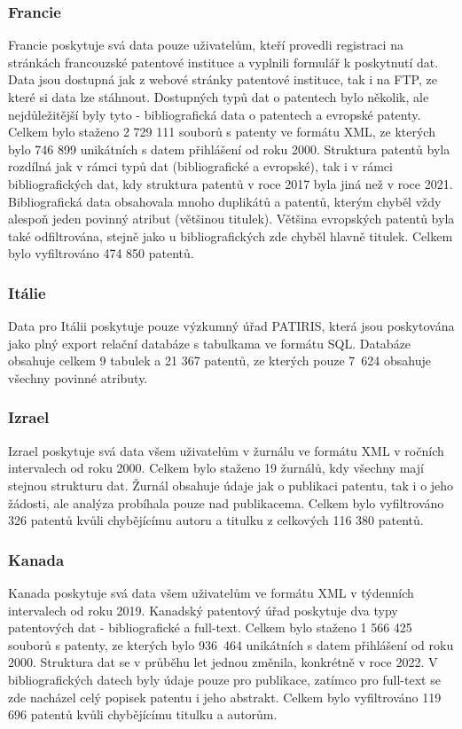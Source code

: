 \subsubsection{Francie}
Francie poskytuje svá data pouze uživatelům, kteří provedli registraci na stránkách francouzské patentové instituce a vyplnili formulář k poskytnutí dat. Data jsou dostupná jak z webové stránky patentové instituce, tak i na \gls{FTP}, ze které si data lze stáhnout. Dostupných typů dat o patentech bylo několik, ale nejdůležitější byly tyto - bibliografická data o patentech a evropské patenty.
\newline
\indent Celkem bylo staženo 2 729 111 souborů s patenty ve formátu \gls{XML}, ze kterých bylo 746 899 unikátních s datem přihlášení od roku 2000. Struktura patentů byla rozdílná jak v rámci typů dat (bibliografické a evropské), tak i v rámci bibliografických dat, kdy struktura patentů v roce 2017 byla jiná než v roce 2021. Bibliografická data obsahovala mnoho duplikátů a patentů, kterým chyběl vždy alespoň jeden povinný atribut (většinou titulek). Většina evropských patentů byla také odfiltrována, stejně jako u bibliografických zde chyběl hlavně titulek. Celkem bylo vyfiltrováno 474 850 patentů.

\subsubsection{Itálie}
Data pro Itálii poskytuje pouze výzkumný úřad PATIRIS, která jsou poskytována jako plný export relační databáze s tabulkama ve formátu \gls{SQL}. Databáze obsahuje celkem 9 tabulek a 21 367 patentů, ze kterých pouze 7~624 obsahuje všechny povinné atributy.

\subsubsection{Izrael}
Izrael poskytuje svá data všem uživatelům v žurnálu ve formátu \gls{XML} v ročních intervalech od roku 2000. Celkem bylo staženo 19 žurnálů, kdy všechny mají stejnou strukturu dat. Žurnál obsahuje údaje jak o publikaci patentu, tak i o jeho žádosti, ale analýza probíhala pouze nad publikacema. Celkem bylo vyfiltrováno 326 patentů kvůli chybějícímu autoru a titulku z celkových 116 380 patentů.

\subsubsection{Kanada}
Kanada poskytuje svá data všem uživatelům ve formátu \gls{XML} v týdenních intervalech od roku 2019. Kanadský patentový úřad poskytuje dva typy patentových dat - bibliografické a full-text.
\newline
\indent Celkem bylo staženo 1 566 425 souborů s patenty, ze kterých bylo 936~464 unikátních s datem přihlášení od roku 2000. Struktura dat se v průběhu let jednou změnila, konkrétně v roce 2022. V bibliografických datech byly údaje pouze pro publikace, zatímco pro full-text se zde nacházel celý popisek patentu i jeho abstrakt. Celkem bylo vyfiltrováno 119 696 patentů kvůli chybějícímu titulku a autorům.

